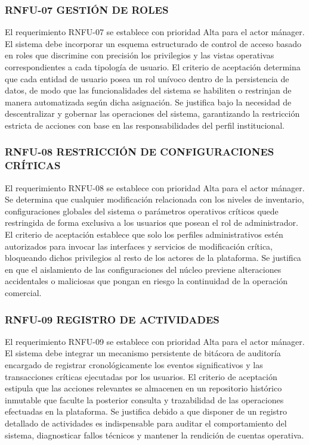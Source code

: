 \subsubsection{RNFU-07 GESTIÓN DE ROLES}
El requerimiento RNFU-07 se establece con prioridad Alta para el actor mánager. El sistema debe incorporar un esquema estructurado de control de acceso basado en roles que discrimine con precisión los privilegios y las vistas operativas correspondientes a cada tipología de usuario. El criterio de aceptación determina que cada entidad de usuario posea un rol unívoco dentro de la persistencia de datos, de modo que las funcionalidades del sistema se habiliten o restrinjan de manera automatizada según dicha asignación. Se justifica bajo la necesidad de descentralizar y gobernar las operaciones del sistema, garantizando la restricción estricta de acciones con base en las responsabilidades del perfil institucional.

\subsubsection{RNFU-08 RESTRICCIÓN DE CONFIGURACIONES CRÍTICAS}
El requerimiento RNFU-08 se establece con prioridad Alta para el actor mánager. Se determina que cualquier modificación relacionada con los niveles de inventario, configuraciones globales del sistema o parámetros operativos críticos quede restringida de forma exclusiva a los usuarios que posean el rol de administrador. El criterio de aceptación establece que solo los perfiles administrativos estén autorizados para invocar las interfaces y servicios de modificación crítica, bloqueando dichos privilegios al resto de los actores de la plataforma. Se justifica en que el aislamiento de las configuraciones del núcleo previene alteraciones accidentales o maliciosas que pongan en riesgo la continuidad de la operación comercial.

\subsubsection{RNFU-09 REGISTRO DE ACTIVIDADES}
El requerimiento RNFU-09 se establece con prioridad Alta para el actor mánager. El sistema debe integrar un mecanismo persistente de bitácora de auditoría encargado de registrar cronológicamente los eventos significativos y las transacciones críticas ejecutadas por los usuarios. El criterio de aceptación estipula que las acciones relevantes se almacenen en un repositorio histórico inmutable que faculte la posterior consulta y trazabilidad de las operaciones efectuadas en la plataforma. Se justifica debido a que disponer de un registro detallado de actividades es indispensable para auditar el comportamiento del sistema, diagnosticar fallos técnicos y mantener la rendición de cuentas operativa.

